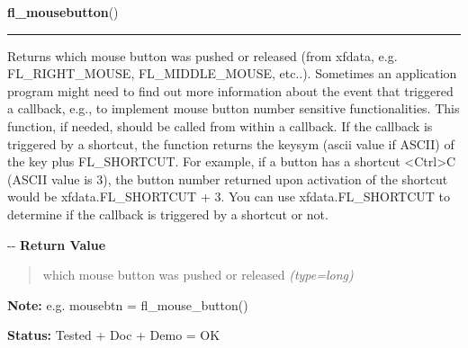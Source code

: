 \hspace{.8\funcindent}\begin{boxedminipage}{\funcwidth}

    \raggedright \textbf{fl\_mousebutton}()

    \vspace{-1.5ex}

    \rule{\textwidth}{0.5\fboxrule}
\setlength{\parskip}{2ex}

Returns which mouse button was pushed or released (from xfdata, e.g.
FL\_RIGHT\_MOUSE, FL\_MIDDLE\_MOUSE, etc..). Sometimes an application program
might need to find out more information about the event that triggered a
callback, e.g., to implement mouse button number sensitive functionalities.
This function, if needed, should be called from within a callback. If the
callback is triggered by a shortcut, the function returns the keysym
(ascii value if ASCII) of the key plus FL\_SHORTCUT. For example, if a
button has a shortcut <Ctrl>C (ASCII value is 3), the button number
returned upon activation of the shortcut would be xfdata.FL\_SHORTCUT + 3.
You can use xfdata.FL\_SHORTCUT to determine if the callback is triggered
by a shortcut or not.

-{}-
\setlength{\parskip}{1ex}
      \textbf{Return Value}
    \vspace{-1ex}

      \begin{quote}

which mouse button was pushed or released
      {\it (type=long)}

      \end{quote}

\textbf{Note:} 
e.g. mousebtn = fl\_mouse\_button()


\textbf{Status:} 
Tested + Doc + Demo = OK


    \end{boxedminipage}

    \label{xformslib:flbasic:fl_set_err_logfp}

    \vspace{0.5ex}

